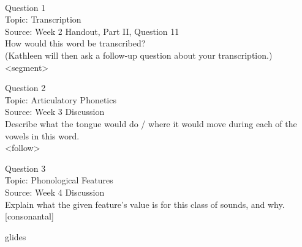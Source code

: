 \documentclass[12pt]{article}
\begin{document}
\newpage

\begin{center}
\textbf{{\color{red}{\HUGE END OF EXAM}}}\\

\end{center}
\newpage

\begin{center}
\textbf{{\color{blue}{\HUGE START OF EXAM\\}}}

\textbf{{\color{blue}{\HUGE Student ID: 27121\\}}}

\textbf{{\color{blue}{\HUGE \\}}}

\end{center}
\newpage

{\large Question 1}\\

Topic: Transcription\\
Source: Week 2 Handout, Part II, Question 11\\

How would this word be transcribed?\\ (Kathleen will then ask a follow-up question about your transcription.)\\

<segment>


\newpage

{\large Question 2}\\

Topic: Articulatory Phonetics\\
Source: Week 3 Discussion\\

Describe what the tongue would do / where it would move during each of the vowels in this word.\\

<follow>


\newpage

{\large Question 3}\\

Topic: Phonological Features\\
Source: Week 4 Discussion\\

Explain what the given feature’s value is for this class of sounds, and why.\\

{[consonantal]}

glides
\end{document}
